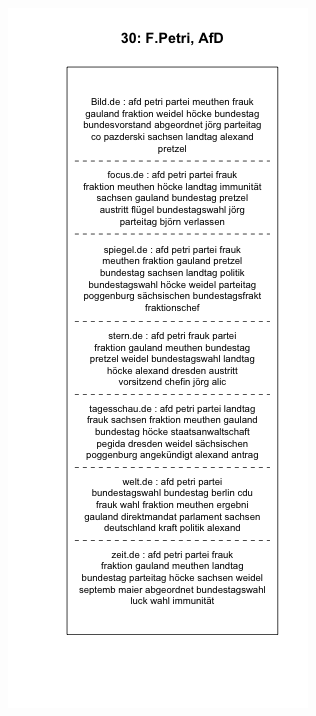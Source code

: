 \documentclass[12pt,a4paper,notitlepage]{article}
\begin{document}
{%
\begin{figure}[H]
	\begin{center}
		\begin{subfigure}[normla]{0.49\textwidth}
			\includegraphics[width=\textwidth]{../figs/plotquote30.png}

\end{subfigure}
\end{center}
\end{figure}}
\end{document}
